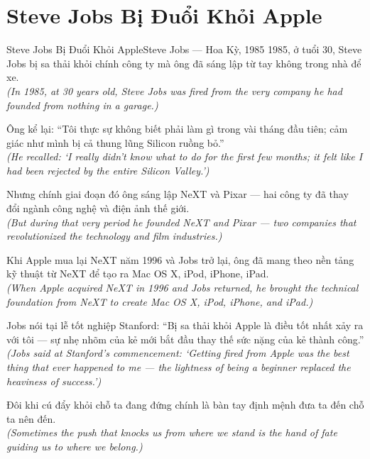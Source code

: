 \section{Steve Jobs Bị Đuổi Khỏi Apple}
\begin{truyen}{Steve Jobs Bị Đuổi Khỏi Apple}{Steve Jobs --- Hoa Kỳ, 1985}
 1985, ở tuổi 30, Steve Jobs bị sa thải khỏi chính công ty mà ông đã sáng lập từ tay không trong nhà để xe.\\[4pt]
\textit{(In 1985, at 30 years old, Steve Jobs was fired from the very company he had founded from nothing in a garage.)}

Ông kể lại: ``Tôi thực sự không biết phải làm gì trong vài tháng đầu tiên; cảm giác như mình bị cả thung lũng Silicon ruồng bỏ.''\\[4pt]
\textit{(He recalled: `I really didn't know what to do for the first few months; it felt like I had been rejected by the entire Silicon Valley.')}

Nhưng chính giai đoạn đó ông sáng lập NeXT và Pixar --- hai công ty đã thay đổi ngành công nghệ và điện ảnh thế giới.\\[4pt]
\textit{(But during that very period he founded NeXT and Pixar --- two companies that revolutionized the technology and film industries.)}

Khi Apple mua lại NeXT năm 1996 và Jobs trở lại, ông đã mang theo nền tảng kỹ thuật từ NeXT để tạo ra Mac OS X, iPod, iPhone, iPad.\\[4pt]
\textit{(When Apple acquired NeXT in 1996 and Jobs returned, he brought the technical foundation from NeXT to create Mac OS X, iPod, iPhone, and iPad.)}

Jobs nói tại lễ tốt nghiệp Stanford: ``Bị sa thải khỏi Apple là điều tốt nhất xảy ra với tôi --- sự nhẹ nhõm của kẻ mới bắt đầu thay thế sức nặng của kẻ thành công.''\\[4pt]
\textit{(Jobs said at Stanford's commencement: `Getting fired from Apple was the best thing that ever happened to me --- the lightness of being a beginner replaced the heaviness of success.')}

\end{truyen}
\begin{baihoc}
  Đôi khi cú đẩy khỏi chỗ ta đang đứng chính là bàn tay định mệnh đưa ta đến chỗ ta nên đến.\\[4pt]
  \textit{(Sometimes the push that knocks us from where we stand is the hand of fate guiding us to where we belong.)}
\end{baihoc}

